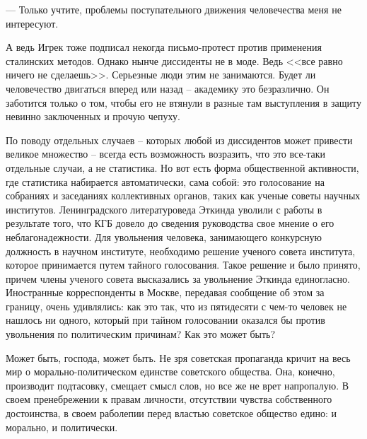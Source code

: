 \documentclass{book}
\begin{document}
--- Только учтите, проблемы поступательного движения человечества меня не интересуют.

А ведь Игрек тоже подписал некогда письмо-протест против применения сталинских методов. Однако нынче диссиденты не в моде. Ведь <<все равно ничего не сделаешь>>. Серьезные люди этим не занимаются. Будет ли человечество двигаться вперед или назад -- академику это безразлично. Он заботится только о том, чтобы его не втянули в разные там выступления в защиту невинно заключенных и прочую чепуху.

По поводу отдельных случаев -- которых любой из диссидентов может привести великое множество -- всегда есть возможность возразить, что это все-таки отдельные случаи, а не статистика. Но вот есть форма общественной активности, где статистика набирается автоматически, сама собой: это голосование на собраниях и заседаниях коллективных органов, таких как ученые советы научных институтов. Ленинградского литературоведа Эткинда уволили с работы в результате того, что КГБ довело до сведения руководства свое мнение о его неблагонадежности. Для увольнения человека, занимающего конкурсную должность в научном институте, необходимо решение ученого совета института, которое принимается путем тайного голосования. Такое решение и было принято, причем члены ученого совета высказались за увольнение Эткинда единогласно.  Иностранные корреспонденты в Москве, передавая сообщение об этом за границу, очень удивлялись: как это так, что из пятидесяти с чем-то человек не нашлось ни одного, кото­рый при тайном голосовании  оказался бы 
против увольнения по политическим причинам? Как это может быть?

Может быть, господа, может быть. Не зря советская пропа­ганда кричит на весь мир о морально-политическом единстве советского общества. Она, конечно, производит подтасовку, смещает смысл слов, но все же не врет напропалую. В своем пренебрежении к правам личности, отсутствии чувства собст­венного достоинства, в своем раболепии перед властью совет­ское общество едино: и морально, и политически.
\end{document}
